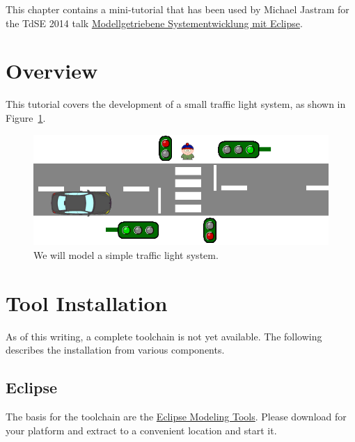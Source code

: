 This chapter contains a mini-tutorial that has been used by Michael Jastram for the TdSE 2014 talk \href{http://www.tdse.org/programm2013/termine/icalrepeat.detail/2014/11/12/83/-/t2-modellgetriebene-systementwicklung-mit-eclipse.html}{Modellgetriebene Systementwicklung mit Eclipse}.

\section{Overview}

This tutorial covers the development of a small traffic light system, as shown in Figure~\ref{fig:trafficlight}.

\begin{figure}[h!]
  \centering
  \includegraphics[width=0.8\linewidth]{../se-images/trafficlight.png}
  \caption{We will model a simple traffic light system.}
  \label{fig:trafficlight}
\end{figure}

\section{Tool Installation}
\label{sec:tutorial-tool-installation}

As of this writing, a complete toolchain is not yet available.  The following describes the installation from various components.

\subsection{Eclipse}

The basis for the toolchain are the \href{https://www.eclipse.org/downloads/packages/eclipse-modeling-tools/lunasr1}{Eclipse Modeling Tools}.  Please download for your platform and extract to a convenient location and start it.

